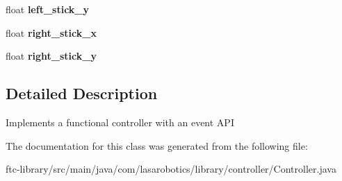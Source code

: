 \begin{DoxyCompactItemize}
\item 
\hypertarget{classcom_1_1lasarobotics_1_1library_1_1controller_1_1_controller_ab777b69e896fada11c8e163ed8e6d4a9}{}float {\bfseries left\+\_\+stick\+\_\+y}\label{classcom_1_1lasarobotics_1_1library_1_1controller_1_1_controller_ab777b69e896fada11c8e163ed8e6d4a9}

\item 
\hypertarget{classcom_1_1lasarobotics_1_1library_1_1controller_1_1_controller_aba83b157128b492662241688da2ab126}{}float {\bfseries right\+\_\+stick\+\_\+x}\label{classcom_1_1lasarobotics_1_1library_1_1controller_1_1_controller_aba83b157128b492662241688da2ab126}

\item 
\hypertarget{classcom_1_1lasarobotics_1_1library_1_1controller_1_1_controller_ab630f9efc5cc853510c52c219a06b878}{}float {\bfseries right\+\_\+stick\+\_\+y}\label{classcom_1_1lasarobotics_1_1library_1_1controller_1_1_controller_ab630f9efc5cc853510c52c219a06b878}

\end{DoxyCompactItemize}


\subsection{Detailed Description}
Implements a functional controller with an event A\+P\+I 

The documentation for this class was generated from the following file\+:\begin{DoxyCompactItemize}
\item 
ftc-\/library/src/main/java/com/lasarobotics/library/controller/Controller.\+java\end{DoxyCompactItemize}
